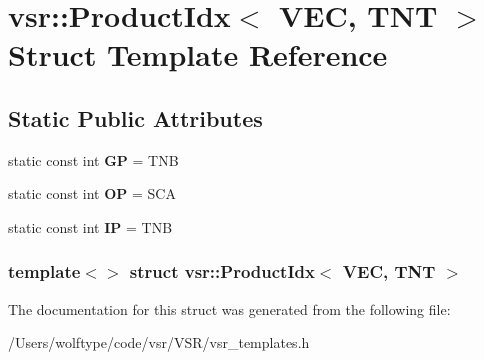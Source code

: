 \hypertarget{structvsr_1_1_product_idx_3_01_v_e_c_00_01_t_n_t_01_4}{\section{vsr\-:\-:Product\-Idx$<$ V\-E\-C, T\-N\-T $>$ Struct Template Reference}
\label{structvsr_1_1_product_idx_3_01_v_e_c_00_01_t_n_t_01_4}
}
\subsection*{Static Public Attributes}
\begin{DoxyCompactItemize}
\item 
\hypertarget{structvsr_1_1_product_idx_3_01_v_e_c_00_01_t_n_t_01_4_aeb44df2eb5dd67175cbe5c9c0db0b0f1}{static const int {\bfseries G\-P} = T\-N\-B}\label{structvsr_1_1_product_idx_3_01_v_e_c_00_01_t_n_t_01_4_aeb44df2eb5dd67175cbe5c9c0db0b0f1}

\item 
\hypertarget{structvsr_1_1_product_idx_3_01_v_e_c_00_01_t_n_t_01_4_a61a3e0fe72732a2b3ca06fed7e29b74c}{static const int {\bfseries O\-P} = S\-C\-A}\label{structvsr_1_1_product_idx_3_01_v_e_c_00_01_t_n_t_01_4_a61a3e0fe72732a2b3ca06fed7e29b74c}

\item 
\hypertarget{structvsr_1_1_product_idx_3_01_v_e_c_00_01_t_n_t_01_4_a1d26cb738ee00857fe3c10dcecca1fb2}{static const int {\bfseries I\-P} = T\-N\-B}\label{structvsr_1_1_product_idx_3_01_v_e_c_00_01_t_n_t_01_4_a1d26cb738ee00857fe3c10dcecca1fb2}

\end{DoxyCompactItemize}
\subsubsection*{template$<$$>$ struct vsr\-::\-Product\-Idx$<$ V\-E\-C, T\-N\-T $>$}



The documentation for this struct was generated from the following file\-:\begin{DoxyCompactItemize}
\item 
/\-Users/wolftype/code/vsr/\-V\-S\-R/vsr\-\_\-templates.\-h\end{DoxyCompactItemize}
